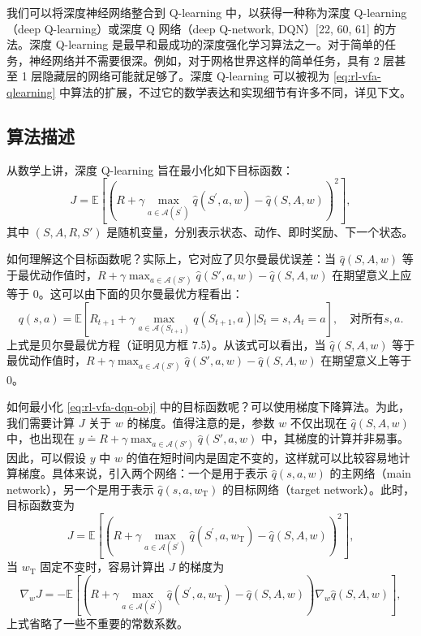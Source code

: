 我们可以将深度神经网络整合到 Q-learning 中，以获得一种称为深度 Q-learning（deep Q-learning）或深度 Q 网络（deep Q-network, DQN）[22, 60, 61] 的方法。深度 Q-learning 是最早和最成功的深度强化学习算法之一。对于简单的任务，神经网络并不需要很深。例如，对于网格世界这样的简单任务，具有 2 层甚至 1 层隐藏层的网络可能就足够了。深度 Q-learning 可以被视为 \cref{eq:rl-vfa-qlearning} 中算法的扩展，不过它的数学表达和实现细节有许多不同，详见下文。

\subsection{算法描述}
\label{sec:rl-vfa-dqn-alg}

从数学上讲，深度 Q-learning 旨在最小化如下目标函数：
\begin{equation}
J = \mathbb{E}\left[\left(R + \gamma \max_{a \in \mathcal{A}(S^{\prime})} \hat{q}(S^{\prime}, a, w) - \hat{q}(S, A, w)\right)^{2}\right],
\label{eq:rl-vfa-dqn-obj}
\end{equation}
其中 $(S, A, R, S')$ 是随机变量，分别表示状态、动作、即时奖励、下一个状态。

如何理解这个目标函数呢？实际上，它对应了贝尔曼最优误差：当 $\hat{q}(S, A, w)$ 等于最优动作值时，$R + \gamma \max_{a \in \mathcal{A}(S')} \hat{q}(S', a, w) - \hat{q}(S, A, w)$ 在期望意义上应等于 $0$。这可以由下面的贝尔曼最优方程看出：
\begin{equation*}
q(s, a) = \mathbb{E}\left[R_{t+1} + \gamma \max_{a \in \mathcal{A}(S_{t+1})} q(S_{t+1}, a) \Big| S_{t} = s, A_{t} = a\right], \quad \text{对所有} s, a.
\end{equation*}
上式是贝尔曼最优方程（证明见方框 7.5）。从该式可以看出，当 $\hat{q}(S, A, w)$ 等于最优动作值时，$R + \gamma \max_{a \in \mathcal{A}(S')} \hat{q}(S', a, w) - \hat{q}(S, A, w)$ 在期望意义上等于 $0$。

如何最小化 \cref{eq:rl-vfa-dqn-obj} 中的目标函数呢？可以使用梯度下降算法。为此，我们需要计算 $J$ 关于 $w$ 的梯度。值得注意的是，参数 $w$ 不仅出现在 $\hat{q}(S, A, w)$ 中，也出现在 $y \doteq R + \gamma \max_{a \in \mathcal{A}(S')} \hat{q}(S', a, w)$ 中，其梯度的计算并非易事。因此，可以假设 $y$ 中 $w$ 的值在短时间内是固定不变的，这样就可以比较容易地计算梯度。具体来说，引入两个网络：一个是用于表示 $\hat{q}(s, a, w)$ 的主网络（main network），另一个是用于表示 $\hat{q}(s, a, w_{\mathrm{T}})$ 的目标网络（target network）。此时，目标函数变为
\begin{equation*}
J = \mathbb{E}\left[\left(R + \gamma \max_{a \in \mathcal{A}(S^{\prime})} \hat{q}(S^{\prime}, a, w_{\mathrm{T}}) - \hat{q}(S, A, w)\right)^{2}\right],
\end{equation*}
当 $w_{\mathrm{T}}$ 固定不变时，容易计算出 $J$ 的梯度为
\begin{equation}
\nabla_{w} J = -\mathbb{E}\left[\left(R + \gamma \max_{a \in \mathcal{A}(S^{\prime})} \hat{q}(S^{\prime}, a, w_{\mathrm{T}}) - \hat{q}(S, A, w)\right) \nabla_{w} \hat{q}(S, A, w)\right],
\label{eq:rl-vfa-dqn-grad}
\end{equation}
上式省略了一些不重要的常数系数。

